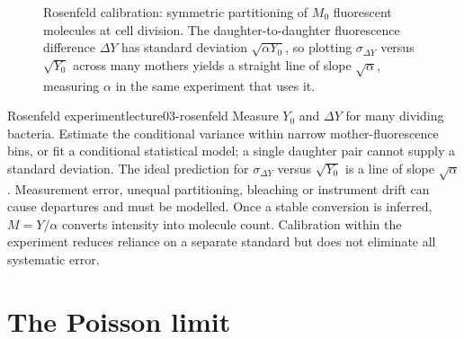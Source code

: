 \begin{figure}[hbt]
\centering
{}
\caption{Rosenfeld calibration: symmetric partitioning of $M_0$ fluorescent molecules at cell division. The daughter-to-daughter fluorescence difference $\Delta Y$ has standard deviation $\sqrt{\alpha Y_0}$, so plotting $\sigma_{\Delta Y}$ versus $\sqrt{Y_0}$ across many mothers yields a straight line of slope $\sqrt{\alpha}$, measuring $\alpha$ in the same experiment that uses it.}
\label{fig:lecture03-rosenfeld}
\end{figure}

\begin{example}{Rosenfeld experiment}{lecture03-rosenfeld}
Measure $Y_0$ and $\Delta Y$ for many dividing bacteria. Estimate the conditional variance within narrow mother-fluorescence bins, or fit a conditional statistical model; a single daughter pair cannot supply a standard deviation. The ideal prediction for $\sigma_{\Delta Y}$ versus $\sqrt{Y_0}$ is a line of slope $\sqrt\alpha$. Measurement error, unequal partitioning, bleaching or instrument drift can cause departures and must be modelled. Once a stable conversion is inferred, $M=Y/\alpha$ converts intensity into molecule count. Calibration within the experiment reduces reliance on a separate standard but does not eliminate all systematic error.
\end{example}

\section{The Poisson limit}\label{sec:lecture03-poisson}

